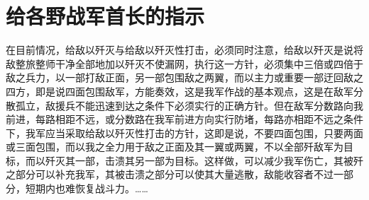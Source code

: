 \section[给各野战军首长的指示（一九四七年八月二十八日）]{给各野战军首长的指示}


在目前情况，给敌以歼灭与给敌以歼灭性打击，必须同时注意，给敌以歼灭是说将敌整旅整师干净全部地加以歼灭不使漏网，执行这一方针，必须集中三倍或四倍于敌之兵力，以一部打敌正面，另一部包围敌之两翼，而以主力或重要一部迂回敌之四方，即是说四面包围敌军，方能奏效，这是我军作战的基本观点，这是在敌军分散孤立，敌援兵不能迅速到达之条件下必须实行的正确方针。但在敌军分数路向我前进，每路相距不远，或分数路在我军前进方向实行防堵，每路亦相距不远之条件下，我军应当采取给敌以歼灭性打击的方针，这即是说，不要四面包围，只要两面或三面包围，而以我之全力用于敌之正面及其一翼或两翼，不以全部歼敌军为目标，而以歼灭其一部，击溃其另一部为目标。这样做，可以减少我军伤亡，其被歼之部分可以补充我军，其被击溃之部分可以使其大量逃散，敌能收容者不过一部分，短期内也难恢复战斗力。……

